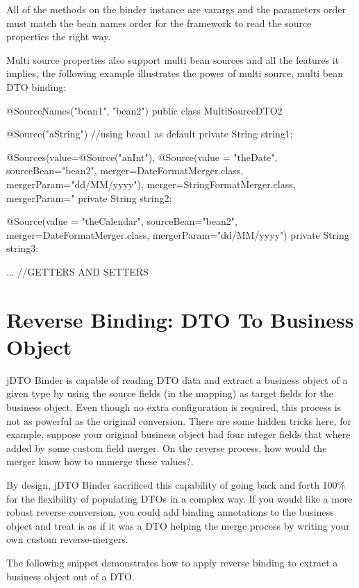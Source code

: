 \documentclass[11pt]{article}
\newcommand{\JDTO}{jDTO Binder\xspace}
\begin{document}
All of the methods on the binder instance are varargs and the parameters order must match the bean names order for the framework to read the source properties the right way.

Multi source properties also support multi bean sources and all the features it implies, the following example illustrates the power of multi source, multi bean DTO binding:


\begin{java}
@SourceNames({"bean1", "bean2"})
public class MultiSourceDTO2 {
    @Source("aString") //using bean1 as default
    private String string1;
    
    @Sources(value={@Source("anInt"), 
            @Source(value = "theDate", 
            sourceBean="bean2", 
            merger=DateFormatMerger.class, 
            mergerParam="dd/MM/yyyy")}, 
        merger=StringFormatMerger.class, mergerParam="%
    private String string2;
    
    @Source(value = "theCalendar", sourceBean="bean2", 
        merger=DateFormatMerger.class, mergerParam="dd/MM/yyyy")
    private String string3;

    ... //GETTERS AND SETTERS
}
\end{java}


\section{Reverse Binding: DTO To Business Object}

\JDTO is capable of reading DTO data and extract a business object of a given type by using the source fields (in the mapping) as target fields for the business object. Even though no extra configuration is required, this process is not as powerful as the original conversion. There are some hidden tricks here, for example, suppose your original business object had four integer fields that where added by some custom field merger. On the reverse process, how would the merger know how to unmerge these values?. 

By design, \JDTO sacrificed this capability of going back and forth 100\% for the flexibility of populating DTOs in a complex way. If you would like a more robust reverse conversion, you could add binding annotations to the business object and treat is as if it was a DTO helping the merge process by writing your own custom reverse-mergers.

The following snippet demonstrates how to apply reverse binding to extract a business object out of a DTO.
\end{document}
